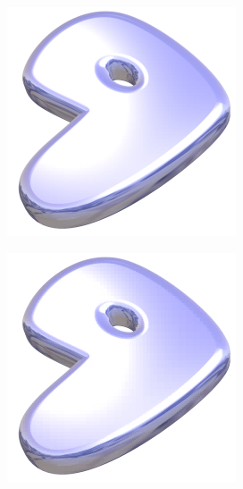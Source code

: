 \documentclass[11pt]{report}
\theoremstyle{plain}
\theoremstyle{remark}
\begin{document}
\begin{figure}
	\centering
	\begin{subfigure}[b]{0.24\textwidth}
		\centering
		\includegraphics[width=\textwidth]{plaatjes/gentoo_haar_0_15.png}
	\end{subfigure}
	\begin{subfigure}[b]{0.24\textwidth}
		\centering
		\includegraphics[width=\textwidth]{plaatjes/gentoo_haar_0_1.png}

\end{subfigure}
\end{figure}
\end{document}
